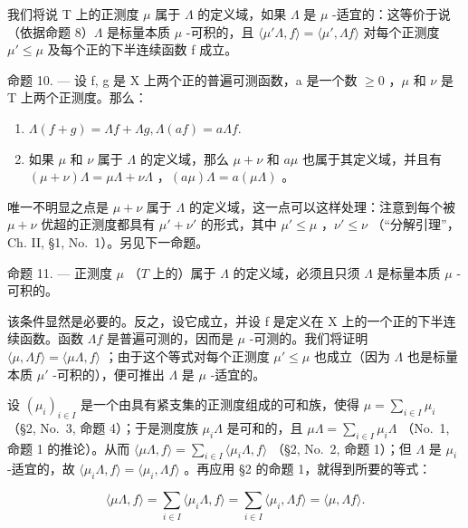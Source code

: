 我们将说 T 上的正测度 \(\mu\) 属于 \(\Lambda\) 的定义域，如果 \(\Lambda\) 是 \(\mu\) -适宜的：这等价于说（依据命题 8）\(\Lambda\) 是标量本质 \(\mu\) -可积的，且 \(\langle\mu'\Lambda,f\rangle=\langle\mu',\Lambda f\rangle\) 对每个正测度 \(\mu'\leqslant\mu\) 及每个正的下半连续函数 f 成立。

命题 10. --- 设 f, g 是 X 上两个正的普遍可测函数，a 是一个数 \(\geqslant 0\) ，\(\mu\) 和 \(\nu\) 是 T 上两个正测度。那么：

\begin{enumerate}
\def\labelenumi{\alph{enumi})}
\item
  \(\Lambda (f + g) = \Lambda f + \Lambda g, \Lambda (af) = a\Lambda f.\)
\item
  如果 \(\mu\) 和 \(\nu\) 属于 \(\Lambda\) 的定义域，那么 \(\mu + \nu\) 和 \(a\mu\) 也属于其定义域，并且有 \((\mu + \nu)\Lambda = \mu \Lambda + \nu \Lambda\) ，\((a\mu)\Lambda = a(\mu \Lambda)\) 。
\end{enumerate}

唯一不明显之点是 \(\mu + \nu\) 属于 \(\Lambda\) 的定义域，这一点可以这样处理：注意到每个被 \(\mu + \nu\) 优超的正测度都具有 \(\mu' + \nu'\) 的形式，其中 \(\mu' \leqslant \mu\) ，\(\nu' \leqslant \nu\) （“分解引理”，Ch. II, §1, No.~1）。另见下一命题。

命题 11. --- 正测度 \(\mu\) （\(T\) 上的）属于 \(\Lambda\) 的定义域，必须且只须 \(\Lambda\) 是标量本质 \(\mu\) -可积的。

该条件显然是必要的。反之，设它成立，并设 f 是定义在 X 上的一个正的下半连续函数。函数 \(\Lambda f\) 是普遍可测的，因而是 \(\mu\) -可测的。我们将证明 \(\langle\mu,\Lambda f\rangle=\langle\mu\Lambda,f\rangle\) ；由于这个等式对每个正测度 \(\mu'\leqslant\mu\) 也成立（因为 \(\Lambda\) 也是标量本质 \(\mu'\) -可积的），便可推出 \(\Lambda\) 是 \(\mu\) -适宜的。

设 \((\mu_i)_{i\in I}\) 是一个由具有紧支集的正测度组成的可和族，使得 \(\mu = \sum_{i\in I}\mu_i\) （§2, No.~3, 命题 4）；于是测度族 \(\mu_{i}\Lambda\) 是可和的，且 \(\mu \Lambda = \sum_{i\in I}\mu_{i}\Lambda\) （No.~1, 命题 1 的推论）。从而 \(\langle \mu \Lambda ,f\rangle = \sum_{i\in I}\langle \mu_i\Lambda ,f\rangle\) （§2, No.~2, 命题 1）；但 \(\Lambda\) 是 \(\mu_{i}\) -适宜的，故 \(\langle \mu_i\Lambda ,f\rangle = \langle \mu_i,\Lambda f\rangle\) 。再应用 §2 的命题 1，就得到所要的等式：

\[
\langle \mu \Lambda , f \rangle = \sum_ {i \in I} \langle \mu_ {i} \Lambda , f \rangle = \sum_ {i \in I} \langle \mu_ {i}, \Lambda f \rangle = \langle \mu , \Lambda f \rangle .
\]

